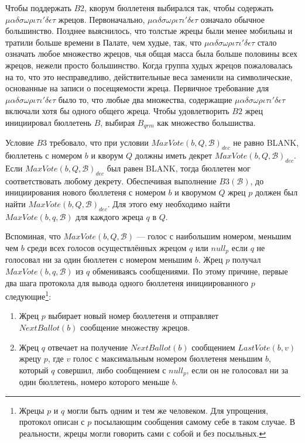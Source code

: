 \documentclass[12pt, a4paper]{article} %
\begin{document}
Чтобы поддержать $B2$, кворум бюллетеня выбирался так, чтобы содержать $\mu\alpha\delta\sigma\omega\rho\iota\tau\iota'\delta\epsilon\tau$ жрецов. Первоначально, $\mu\alpha\delta\sigma\omega\rho\iota\tau\iota'\delta\epsilon\tau$ означало обычное большинство. Позднее выяснилось, что толстые жрецы были менее мобильны и тратили больше времени в Палате, чем худые, так, что $\mu\alpha\delta\sigma\omega\rho\iota\tau\iota'\delta\epsilon\tau$ стало означать любое множество жрецов, чья общая масса была больше половины всех жрецов, нежели просто большинство. Когда группа худых жрецов пожаловалась на то, что это несправедливо, действительные веса заменили на символические, основанные на записи о посещяемости жреца. Первичное требование для $\mu\alpha\delta\sigma\omega\rho\iota\tau\iota'\delta\epsilon\tau$ было то, что любые два множества, содержащие $\mu\alpha\delta\sigma\omega\rho\iota\tau\iota'\delta\epsilon\tau$ включали хотя бы одного общего жреца. Чтобы удовлетворить $B2$ жрец инициировал бюллетень $B$, выбирая $B_{qrm}$ как множество большиства.

Условие $B3$ требовало, что при условии $MaxVote(b, Q, \mathcal{B})_{dec}$ не равно \textsc{BLANK}, бюллетень с номером $b$ и кворум $Q$ должны иметь декрет $MaxVote(b, Q, \mathcal{B})_{dec}$. Если $MaxVote(b, Q, \mathcal{B})_{dec}$ был равен \textsc{BLANK}, тогда бюллетен мог соответствовать любому декрету. Обеспечивая выполнение $B3(\mathcal{B})$, до инициирования нового бюллетеня с номером $b$ и кворумом $Q$ жрец $p$ должен был найти $MaxVote(b, Q, \mathcal{B})_{dec}$. Для этого ему необходимо найти $MaxVote(b, q, \mathcal{B})$ для каждого жреца $q$ в $Q$.

Вспоминая, что $MaxVote(b, Q, \mathcal{B})$ --- голос с наибольшим номером, меньшим чем $b$ среди всех голосов осуществлённых жрецом $q$ или $null_p$ если $q$ не голосовал ни за один бюллетен с номером меньшим $b$. Жрец $p$ получал $MaxVote(b, q, \mathcal{B})$ из $q$ обмениваясь сообщениями. По этому причине, первые два шага протокола для вывода одного бюллетеня инициированного $p$ следующие\footnote{Жрецы $p$ и $q$ могли быть одним и тем же человеком. Для упрощения, протокол описан с $p$ посылающим сообщения самому себе в таком случае. В реальности, жрецы могли говорить сами с собой и без посыльных.}:

\begin{enumerate}
    \item Жрец $p$ выбирает новый номер бюллетеня и отправляет \\$NextBallot(b)$ сообщение множеству жрецов.
    \item Жрец $q$ отвечает на получение $NextBallot(b)$ сообщением $LastVote(b, v)$ жрецу $p$, где $v$ голос с максимальным номером бюллетеня меньшим $b$, который $q$ совершил, либо сообщением с $null_p$, если он не голосовал ни за один бюллетень, номеро которого меньше $b$.
\end{enumerate}
\end{document}

